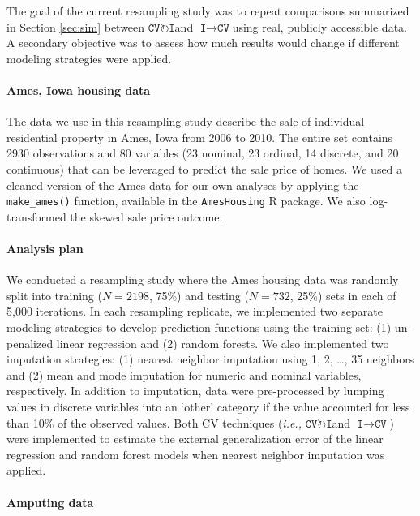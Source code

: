 \documentclass[AMA,STIX1COL,doublespace]{WileyNJD-v2}
\begin{document}
The goal of the current resampling study was to repeat comparisons
summarized in Section \ref{sec:sim} between
$\texttt{CV}\!\circlearrowright\!\texttt{I}$\space and
$\texttt{I}\!\!\rightarrow\!\texttt{CV}$\space using real, publicly
accessible data. A secondary objective was to assess how much results
would change if different modeling strategies were applied.

\paragraph{Ames, Iowa housing data}

The data we use in this resampling study describe the sale of individual
residential property in Ames, Iowa from 2006 to 2010. The entire set
contains 2930 observations and 80 variables (23 nominal, 23 ordinal, 14
discrete, and 20 continuous) that can be leveraged to predict the sale
price of homes.\cite{de2011ames} We used a cleaned version of the Ames
data for our own analyses by applying the \texttt{make\_ames()}
function, available in the \texttt{AmesHousing} R
package.\cite{AmesHousing} We also log-transformed the skewed sale price
outcome.

\paragraph{Analysis plan}

We conducted a resampling study where the Ames housing data was randomly
split into training (\(N = 2198\), 75\%) and testing (\(N = 732\), 25\%)
sets in each of 5,000 iterations. In each resampling replicate, we
implemented two separate modeling strategies to develop prediction
functions using the training set: (1) un-penalized linear regression and
(2) random forests.\cite{breiman2001random} We also implemented two
imputation strategies: (1) nearest neighbor imputation using 1, 2,
\ldots, 35 neighbors and (2) mean and mode imputation for numeric and
nominal variables, respectively. In addition to imputation, data were
pre-processed by lumping values in discrete variables into an `other'
category if the value accounted for less than 10\% of the observed
values. Both CV techniques
(\textit{i.e., }$\texttt{CV}\!\circlearrowright\!\texttt{I}$\space and
$\texttt{I}\!\!\rightarrow\!\texttt{CV}$) were implemented to estimate
the external generalization error of the linear regression and random
forest models when nearest neighbor imputation was applied.

\paragraph{Amputing data}
\end{document}
